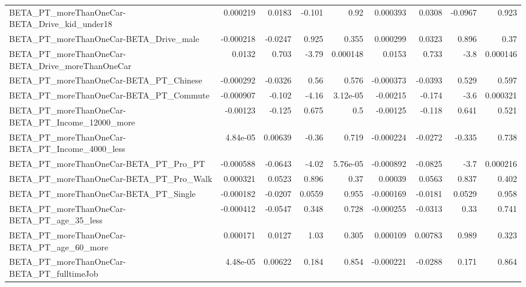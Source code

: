 \begin{tabular}{lrrrrrrrr}
BETA\_PT\_moreThanOneCar-BETA\_Drive\_kid\_under18      &    0.000219 &       0.0183 &    -0.101 &     0.92 &   0.000393 &      0.0308 &      -0.0967 &         0.923 \\
BETA\_PT\_moreThanOneCar-BETA\_Drive\_male             &   -0.000218 &      -0.0247 &     0.925 &    0.355 &   0.000299 &      0.0323 &        0.896 &          0.37 \\
BETA\_PT\_moreThanOneCar-BETA\_Drive\_moreThanOneCar   &      0.0132 &        0.703 &     -3.79 & 0.000148 &     0.0153 &       0.733 &         -3.8 &      0.000146 \\
BETA\_PT\_moreThanOneCar-BETA\_PT\_Chinese             &   -0.000292 &      -0.0326 &      0.56 &    0.576 &  -0.000373 &     -0.0393 &        0.529 &         0.597 \\
BETA\_PT\_moreThanOneCar-BETA\_PT\_Commute             &   -0.000907 &       -0.102 &     -4.16 & 3.12e-05 &   -0.00215 &      -0.174 &         -3.6 &      0.000321 \\
BETA\_PT\_moreThanOneCar-BETA\_PT\_Income\_12000\_more   &    -0.00123 &       -0.125 &     0.675 &      0.5 &   -0.00125 &      -0.118 &        0.641 &         0.521 \\
BETA\_PT\_moreThanOneCar-BETA\_PT\_Income\_4000\_less    &    4.84e-05 &      0.00639 &     -0.36 &    0.719 &  -0.000224 &     -0.0272 &       -0.335 &         0.738 \\
BETA\_PT\_moreThanOneCar-BETA\_PT\_Pro\_PT              &   -0.000588 &      -0.0643 &     -4.02 & 5.76e-05 &  -0.000892 &     -0.0825 &         -3.7 &      0.000216 \\
BETA\_PT\_moreThanOneCar-BETA\_PT\_Pro\_Walk            &    0.000321 &       0.0523 &     0.896 &     0.37 &    0.00039 &      0.0563 &        0.837 &         0.402 \\
BETA\_PT\_moreThanOneCar-BETA\_PT\_Single              &   -0.000182 &      -0.0207 &    0.0559 &    0.955 &  -0.000169 &     -0.0181 &       0.0529 &         0.958 \\
BETA\_PT\_moreThanOneCar-BETA\_PT\_age\_35\_less         &   -0.000412 &      -0.0547 &     0.348 &    0.728 &  -0.000255 &     -0.0313 &         0.33 &         0.741 \\
BETA\_PT\_moreThanOneCar-BETA\_PT\_age\_60\_more         &    0.000171 &       0.0127 &      1.03 &    0.305 &   0.000109 &     0.00783 &        0.989 &         0.323 \\
BETA\_PT\_moreThanOneCar-BETA\_PT\_fulltimeJob         &    4.48e-05 &      0.00622 &     0.184 &    0.854 &  -0.000221 &     -0.0288 &        0.171 &         0.864 \\

\end{tabular}

